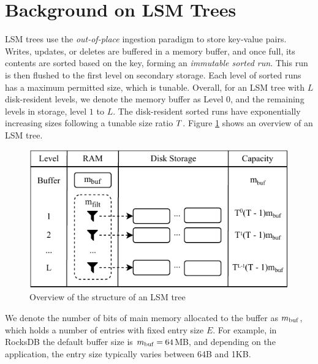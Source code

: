 
\section{Background on LSM Trees}
\label{sec:background}



LSM trees use the \textit{out-of-place} ingestion paradigm to store key-value
pairs. Writes, updates, or deletes are buffered in a memory buffer, and once
full, its contents are sorted based on the key, forming an
\textit{immutable sorted run}. This run is then flushed to the first level on
secondary storage. Each level of sorted runs has a maximum permitted size, which
is tunable. Overall, for an LSM tree with $L$ disk-resident levels, we denote the
memory buffer as Level $0$, and the remaining
levels in storage, level $1$ to $L$. The disk-resident sorted runs have exponentially increasing
sizes following a tunable size ratio ${{T}}$.
Figure \ref{fig:lsm-overview} shows an overview of an LSM tree.

\begin{figure}[h]
    \centering
    \includegraphics[scale=0.75]{figures/lsm_overview.pdf}
    \caption{Overview of the structure of an LSM tree}
    \label{fig:lsm-overview}
\end{figure}


We denote the number of bits of main memory allocated to the buffer as ${{m_{\mathrm{buf}}}}$,
which holds a number of entries with fixed entry size $E$. For example, in
RocksDB the default buffer size is ${{m_{\mathrm{buf}}}}=64$MB, and depending on the
application, the entry size typically varies between 64B and 1KB. 

